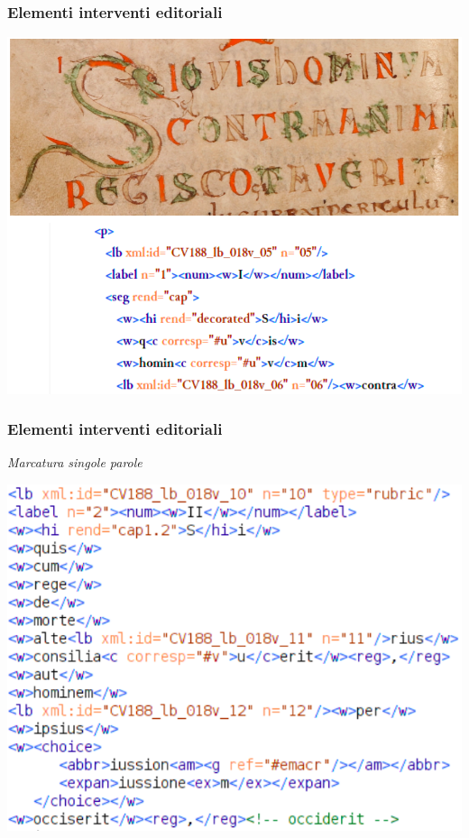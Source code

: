 \begin{frame}
    \frametitle{Elementi interventi editoriali}
    \addtocounter{nframe}{1}
        \begin{center}
            \includegraphics[width=.9\textwidth]{imgs/Decorazioni.png}
        \end{center}
\end{frame}

\begin{frame}
    \frametitle{Elementi interventi editoriali}
    \addtocounter{nframe}{1}
    
    \textit{Marcatura singole parole}
        \begin{center}
            \includegraphics[width=.9\textwidth]{imgs/MarcaturaParole.png}
        \end{center}
    
    
\end{frame}

